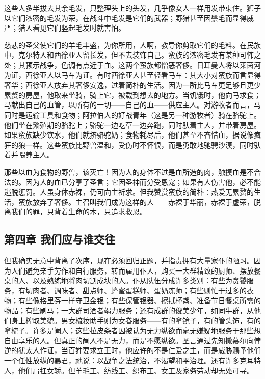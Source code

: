 这些人多半拔去其余毛发，只整理头上的头发，几乎像女人一样用发带束住。狮子以它们浓密的毛发为荣，在战斗中毛发是它们的武器；野猪甚至因鬃毛而显得威严；猎人看见它们竖起毛发时就害怕。\par

\par

慈悲的圣父使它们的羊毛丰盛，为你所用，人啊，教导你剪取它们的毛料。在民族中，克尔特人和西徐亚人留长发，但不去装饰自己。蛮族的浓密毛发有某种可怖之处；其预示战争，色调有点近于血。这两个蛮族都憎恶奢侈。日耳曼人将以莱茵河为证，西徐亚人以马车为证。有时西徐亚人甚至轻看马车：其大小对蛮族而言显得奢华；西徐亚人放弃其奢侈安逸，过着简朴的生活。因为一所比马车更足够且更少累赘的房屋，他取来坐骑，骑上它，被载到想去的地方。当饥饿时，他向马求食；马献出自己的血管，以所有的一切——自己的血——供应主人。对游牧者而言，马同时是运输工具和食物；阿拉伯人的好战青年（这是另一种游牧者）骑在骆驼上。他们坐在繁殖期的骆驼上；骆驼一边吃草一边奔跑，同时驮着主人，并带着房屋。如果蛮族缺少饮水，他们就挤骆驼奶；食物耗尽后，他们甚至不吝惜血，据说像疯狂的狼一样。这些蛮族比野兽温和，受伤时不怀恨，而是勇敢地驰骋沙漠，同时驮着并喂养主人。\par

那些以血为食物的野兽，该灭亡！因为人的身体不过是血所造的肉，触摸血是不合法的。因为人的血已分享了圣言；它因圣神而分受恩宠；如果有人伤害他，必不能逃脱惩罚。人虽身体赤裸，仍可向主祈求。但我赞赏蛮族的简朴：热爱无累赘的生活，蛮族放弃了奢侈。主召叫我们成为这样的人——赤裸于华丽，赤裸于虚荣，脱离我们的罪，只背着生命的木，只追求救恩。\par


\subsection{第四章 我们应与谁交往}

但我确实无意中背离了次序，现在必须回归正题，并指责拥有大量家仆的陋习。因为人们避免亲手劳作和自行服务，转而雇用仆人，购买一大群精致的厨师、摆放餐桌的人、以及熟练地将肉切割成块的人。仆从队伍分成许多类别：有些为贪饕服务，有切肉者、调味者、甜点师、蜂蜜蛋糕师、蛋奶冻师；有些则忙于过多的衣物；有些像格里芬一样守卫金银；有些保管银器、擦拭杯盏、准备节日餐桌所需的物品；有些刷马；一大群司酒者竭力服务；还有成群的俊美少年，如同牛群，从他们身上榨取美貌。男女梳妆助手则为女眷服务——有的拿镜子，有的管头饰，有的拿梳子。许多是阉人；这些拉皮条者因被认为无力纵欲而毫无嫌疑地服务于那些想自由享乐的人。但真正的阉人不是无力，而是不愿纵欲。圣言通过先知撒慕尔向悖逆的犹太人作证，当百姓要求立王时，他应许的不是仁爱之主，而是威胁赐予他们一个任性放纵的暴君，祂说：以战争之法统治，不渴望和平治理。还有许多克耳特人，他们肩扛女轿。但羊毛工、纺线工、织布工、女工及家务劳动却无处可寻。\par

